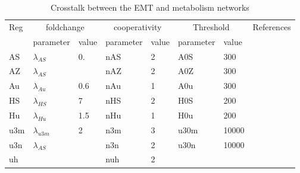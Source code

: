 \documentclass{article}
\begin{document}
\begin{table}[ht]
\begin{tabular}{l||ll|ll|ll|l}
Reg &  \multicolumn{2}{|c|}{foldchange}&  \multicolumn{2}{|c|}{cooperativity}&  \multicolumn{2}{|c}{Threshold}  & References\\
& parameter & value& parameter & value& parameter & value\\
\hline
AS &  $\lambda_{AS}$\cite{Chou2014} &  0.&nAS & 2 &  A0S & 300 & \cite{Chou2014}\\
AZ & $\lambda_{AS}$ & & nAZ\cite{Ohshima2019} & 2  & A0Z& 300 & \cite{Ohshima2019, Dong2016}\\   
Au & $\lambda_{Au}$\cite{Jin2019} &0.6&  nAu\cite{Zhang2019} & 1 & A0u & 300  & \cite{Huang2015, Jin2019, Janin2016, Zhang2019,Thomson2008}\\
HS& $\lambda_{HS}$ \cite{Xu2015} & 7  & nHS\cite{Xu2015} & 2& H0S& 200 & \cite{Xu2015}\\
Hu & $\lambda_{Hu}$\cite{Shang2017} &1.5 & nHu & 1& H0u & 200 &  \cite{Serocki2018,Bartoszewska2015,Shang2017} \\
u3m &$\lambda_{u3m}$\cite{Bai2011} & 2  & n3m & 3& u30m & 10000 &  \cite{Kovac2015,He2020,Li2011,Bai2011, Navarro2015,Italiano2012}\\
u3n &$\lambda_{AS}$ &  &n3n & 2 &u30n & 10000 & \cite{Kovac2015,He2020,Li2011,Bai2011, Navarro2015,Italiano2012}\\
uh & &&nuh & 2&& &\cite{Serocki2018,Shang2017,Byun2019,Serocki2018,Bartoszewska2015} \\
\end{tabular}
\label{table:xparams}
\caption{Crosstalk between the EMT and metabolism networks}
\end{table}
\end{document}
